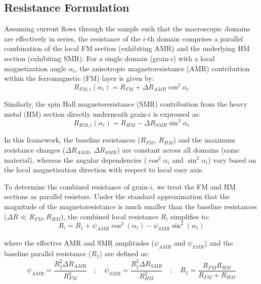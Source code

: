 \documentclass[11pt,a4paper]{article}
\begin{document}
\subsection{Resistance Formulation}
Assuming current flows through the sample such that the macroscopic domains are effectively in series, the resistance of the $i$-th domain comprises a parallel combination of the local FM section (exhibiting AMR) and the underlying HM section (exhibiting SMR). For a single domain (grain-$i$) with a local magnetization angle $\alpha_i$, the anisotropic magnetoresistance (AMR) contribution within the ferromagnetic (FM) layer is given by:
\begin{equation}
    R_{FM,i}(\alpha_i) = R_{FM} + \Delta R_{AMR}\cos^2\alpha_i
\end{equation}

Similarly, the spin Hall magnetoresistance (SMR) contribution from the heavy metal (HM) section directly underneath grain-$i$ is expressed as:
\begin{equation}
    R_{HM,i}(\alpha_i) = R_{HM} - \Delta R_{SMR}\sin^2\alpha_i
\end{equation}

In this framework, the baseline resistances ($R_{FM}$, $R_{HM}$) and the maximum resistance changes ($\Delta R_{AMR}$, $\Delta R_{SMR}$) are constant across all domains (same material), whereas the angular dependencies ($\cos^2\alpha_i$ and $\sin^2\alpha_i$) vary based on the local magnetization direction with respect to local easy axis.

To determine the combined resistance of grain-$i$, we treat the FM and HM sections as parallel resistors. Under the standard approximation that the magnitude of the magnetoresistance is much smaller than the baseline resistances ($\Delta R \ll R_{FM}, R_{HM}$), the combined local resistance $R_i$ simplifies to:
\begin{equation}
    R_i = R_{\parallel} + \psi_{AMR}\cos^2(\alpha_i) - \psi_{SMR}\sin^2(\alpha_i)
\end{equation}

where the effective AMR and SMR amplitudes ($\psi_{AMR}$ and $\psi_{SMR}$) and the baseline parallel resistance ($R_{\parallel}$) are defined as:
\begin{equation}
    \psi_{AMR} = \frac{R_{\parallel}^2 \Delta R_{AMR}}{R_{FM}^2} \quad ; \quad \psi_{SMR} = \frac{R_{\parallel}^2 \Delta R_{SMR}}{R_{HM}^2} \quad ; \quad R_{\parallel} = \frac{R_{FM}R_{HM}}{R_{FM}+R_{HM}}
\end{equation}
\end{document}
